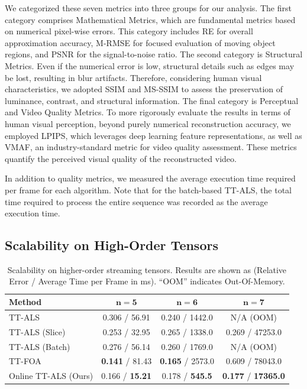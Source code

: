 \documentclass[a4paper, 11pt]{article}
\theoremstyle{plain}
\theoremstyle{definition}
\theoremstyle{remark}
\begin{document}
We categorized these seven metrics into three groups for our analysis.
The first category comprises Mathematical Metrics, which are fundamental metrics based on numerical pixel-wise errors.
This category includes RE for overall approximation accuracy, M-RMSE for focused evaluation of moving object regions, and PSNR for the signal-to-noise ratio.
The second category is Structural Metrics.
Even if the numerical error is low, structural details such as edges may be lost, resulting in blur artifacts.
Therefore, considering human visual characteristics, we adopted SSIM and MS-SSIM to assess the preservation of luminance, contrast, and structural information.
The final category is Perceptual and Video Quality Metrics.
To more rigorously evaluate the results in terms of human visual perception, beyond purely numerical reconstruction accuracy, we employed LPIPS, which leverages deep learning feature representations, as well as VMAF, an industry-standard metric for video quality assessment.
These metrics quantify the perceived visual quality of the reconstructed video.

In addition to quality metrics, we measured the average execution time required per frame for each algorithm.
Note that for the batch-based TT-ALS, the total time required to process the entire sequence was recorded as the average execution time.

\subsection{Scalability on High-Order Tensors}
\begin{table}[!t]
    \centering
    \caption{Scalability on higher-order streaming tensors. Results are shown as (Relative Error / Average Time per Frame in ms). ``OOM'' indicates Out-Of-Memory.}
    \label{tab:high_order_scalability}
        \begin{tabular}{l c c c}
            \toprule
            \textbf{Method} & $\mathbf{n=5}$ & $\mathbf{n=6}$ & $\mathbf{n=7}$ \\
            \midrule
            TT-ALS      & 0.306 / 56.91 & 0.240 / 1442.0 & N/A (OOM) \\
            TT-ALS (Slice)    & 0.253 / 32.95 & 0.265 / 1338.0 & 0.269 / 47253.0 \\
            TT-ALS (Batch) & 0.276 / 56.14 & 0.260 / 1769.0 & N/A (OOM) \\
            TT-FOA            & \textbf{0.141} / 81.43 & \textbf{0.165} / 2573.0 & 0.609 / 78043.0 \\
            Online TT-ALS (Ours) & 0.166 / \textbf{15.21} & 0.178 / \textbf{545.5} & \textbf{0.177} / \textbf{17365.0} \\
            \bottomrule
        \end{tabular}
\end{table}
\end{document}
